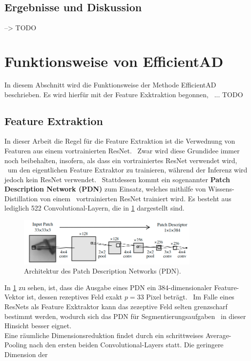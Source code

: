 \subsection{Ergebnisse und Diskussion}
--> TODO
\section{Funktionsweise von EfficientAD}\label{sec:funktionsweisevonEfficientAD}
In diesem Abschnitt wird die Funktionsweise der Methode EfficientAD beschrieben. Es wird hierfür mit der Feature Exktraktion begonnen, \
... TODO
\subsection{Feature Extraktion}\label{subsubsec:featureextraktion}
In dieser Arbeit die Regel für die Feature Extraktion ist die Verwednung von Featuren aus einem vortrainierten ResNet. \ 
Zwar wird diese Grundidee immer noch beibehalten, insofern, als dass ein vortrainiertes ResNet verwendet wird, \
um den eigentlichen Feature Extraktor zu trainieren, während der Inferenz wird jedoch kein ResNet verwendet. \
Stattdessen kommt ein sogenannter \textbf{Patch Description Network (PDN)} zum Einsatz, welches mithilfe von Wissens-Distillation von einem \
vortrainierten ResNet trainiert wird. Es besteht aus lediglich 522 Convolutional-Layern, die in \ref{fig:pdn} dargestellt sind. \\
\begin{figure}
    \centering
    \includegraphics[width=0.8\textwidth]{bilder/pdn.png}
    \caption{Architektur des Patch Description Networks (PDN). \cite{efficientad}}
    \label{fig:pdn}
\end{figure}
In \ref{fig:pdn} zu sehen, ist, dass die Ausgabe eines PDN ein 384-dimensionaler Feature-Vektor ist, dessen rezeptives Feld exakt $p=33$ Pixel beträgt. \
Im Falle eines ResNets als Feature Exktraktor kann das zezeptive Feld selten grenzscharf bestimmt werden, wodurch sich das PDN für Segmentierungsaufgaben \
in dieser Hinsicht besser eignet. \\
Eine räumliche Dimensionsreduktion findet durch ein schrittweises Average-Pooling nach den ersten beiden Convolutional-Layers statt. Die geringere Dimension der \
